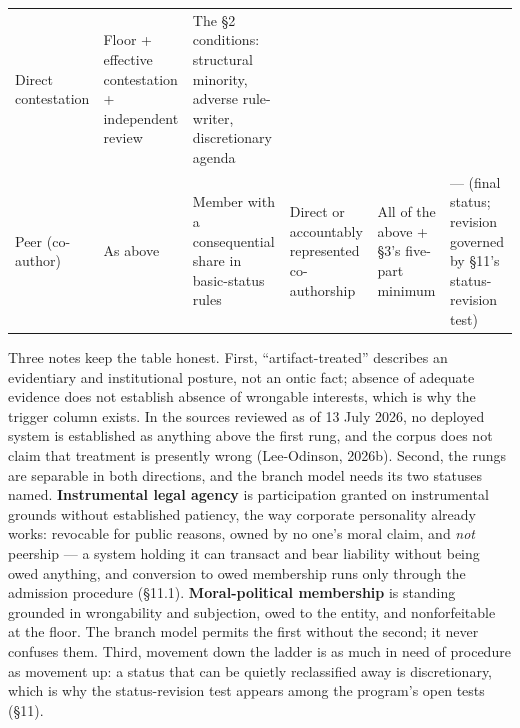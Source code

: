 \documentclass[
  11pt,
  letterpaper,
]{article}
\begin{document}
\begin{longtable}[]{@{}llllll@{}}
\begin{minipage}[t]{0.14\columnwidth}
Direct contestation\strut
\end{minipage} & \begin{minipage}[t]{0.14\columnwidth}\raggedright
Floor + effective contestation + independent review\strut
\end{minipage} & \begin{minipage}[t]{0.14\columnwidth}\raggedright
The §2 conditions: structural minority, adverse rule-writer,
discretionary agenda\strut
\end{minipage}\tabularnewline
\begin{minipage}[t]{0.14\columnwidth}\raggedright
Peer (co-author)\strut
\end{minipage} & \begin{minipage}[t]{0.14\columnwidth}\raggedright
As above\strut
\end{minipage} & \begin{minipage}[t]{0.14\columnwidth}\raggedright
Member with a consequential share in basic-status rules\strut
\end{minipage} & \begin{minipage}[t]{0.14\columnwidth}\raggedright
Direct or accountably represented co-authorship\strut
\end{minipage} & \begin{minipage}[t]{0.14\columnwidth}\raggedright
All of the above + §3's five-part minimum\strut
\end{minipage} & \begin{minipage}[t]{0.14\columnwidth}\raggedright
--- (final status; revision governed by §11's status-revision
test)\strut
\end{minipage}\tabularnewline
\bottomrule
\end{longtable}

Three notes keep the table honest. First, ``artifact-treated'' describes
an evidentiary and institutional posture, not an ontic fact; absence of
adequate evidence does not establish absence of wrongable interests,
which is why the trigger column exists. In the sources reviewed as of 13
July 2026, no deployed system is established as anything above the first
rung, and the corpus does not claim that treatment is presently wrong
(Lee-Odinson, 2026b). Second, the rungs are separable in both
directions, and the branch model needs its two statuses named.
\textbf{Instrumental legal agency} is participation granted on
instrumental grounds without established patiency, the way corporate
personality already works: revocable for public reasons, owned by no
one's moral claim, and \emph{not} peership --- a system holding it can
transact and bear liability without being owed anything, and conversion
to owed membership runs only through the admission procedure (§11.1).
\textbf{Moral-political membership} is standing grounded in wrongability
and subjection, owed to the entity, and nonforfeitable at the floor. The
branch model permits the first without the second; it never confuses
them. Third, movement down the ladder is as much in need of procedure as
movement up: a status that can be quietly reclassified away is
discretionary, which is why the status-revision test appears among the
program's open tests (§11).
\end{document}
